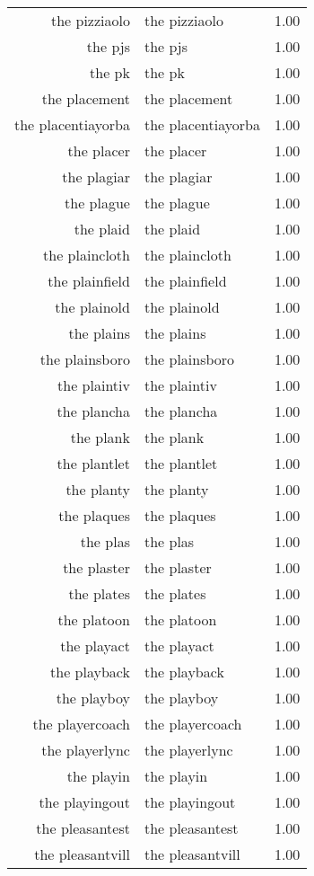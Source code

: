 \begin{table}[ht]
\begin{tabular}{rlr}
  the pizziaolo & the pizziaolo & 1.00 \\ 
  the pjs & the pjs & 1.00 \\ 
  the pk & the pk & 1.00 \\ 
  the placement & the placement & 1.00 \\ 
  the placentiayorba & the placentiayorba & 1.00 \\ 
  the placer & the placer & 1.00 \\ 
  the plagiar & the plagiar & 1.00 \\ 
  the plague & the plague & 1.00 \\ 
  the plaid & the plaid & 1.00 \\ 
  the plaincloth & the plaincloth & 1.00 \\ 
  the plainfield & the plainfield & 1.00 \\ 
  the plainold & the plainold & 1.00 \\ 
  the plains & the plains & 1.00 \\ 
  the plainsboro & the plainsboro & 1.00 \\ 
  the plaintiv & the plaintiv & 1.00 \\ 
  the plancha & the plancha & 1.00 \\ 
  the plank & the plank & 1.00 \\ 
  the plantlet & the plantlet & 1.00 \\ 
  the planty & the planty & 1.00 \\ 
  the plaques & the plaques & 1.00 \\ 
  the plas & the plas & 1.00 \\ 
  the plaster & the plaster & 1.00 \\ 
  the plates & the plates & 1.00 \\ 
  the platoon & the platoon & 1.00 \\ 
  the playact & the playact & 1.00 \\ 
  the playback & the playback & 1.00 \\ 
  the playboy & the playboy & 1.00 \\ 
  the playercoach & the playercoach & 1.00 \\ 
  the playerlync & the playerlync & 1.00 \\ 
  the playin & the playin & 1.00 \\ 
  the playingout & the playingout & 1.00 \\ 
  the pleasantest & the pleasantest & 1.00 \\ 
  the pleasantvill & the pleasantvill & 1.00 \\ 

\end{tabular}
\end{table}

